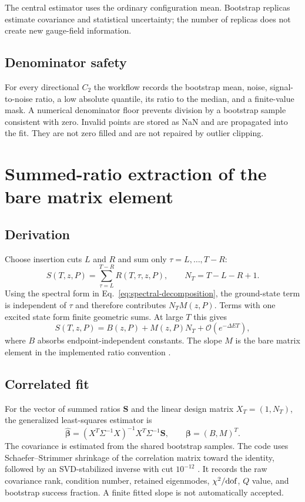 \documentclass[11pt]{article}
\numberwithin{equation}{section}
\newcommand{\cO}{\mathcal{O}}
\begin{document}
The central estimator uses the ordinary configuration mean.  Bootstrap
replicas estimate covariance and statistical uncertainty; the number of
replicas does not create new gauge-field information.

\subsection{Denominator safety}

For every directional $C_2$ the workflow records the bootstrap mean, noise,
signal-to-noise ratio, a low absolute quantile, its ratio to the median, and a
finite-value mask.  A numerical denominator floor prevents division by a
bootstrap sample consistent with zero.  Invalid points are stored as NaN and
are propagated into the fit.  They are not zero filled and are not repaired by
outlier clipping.

\section{Summed-ratio extraction of the bare matrix element}

\subsection{Derivation}

Choose insertion cuts $L$ and $R$ and sum only
$\tau=L,\ldots,T-R$:
\begin{equation}
  S(T,z,P)=\sum_{\tau=L}^{T-R}R(T,\tau,z,P),
  \qquad N_T=T-L-R+1.
  \label{eq:summed-ratio}
\end{equation}
Using the spectral form in Eq.~\eqref{eq:spectral-decomposition}, the
ground-state term is independent of $\tau$ and therefore contributes
$N_T M(z,P)$.  Terms with one excited state form finite geometric sums.  At
large $T$ this gives
\begin{equation}
  S(T,z,P)=B(z,P)+M(z,P)N_T
  +\cO(e^{-\Delta E T}),
  \label{eq:summation-fit}
\end{equation}
where $B$ absorbs endpoint-independent constants.  The slope $M$ is the bare
matrix element in the implemented ratio convention \cite{Bulava2012}.

\subsection{Correlated fit}

For the vector of summed ratios $\bm S$ and the linear design matrix
$X_T=(1,N_T)$, the generalized least-squares estimator is
\begin{equation}
  \widehat{\bm\beta}
  =(X^T\Sigma^{-1}X)^{-1}X^T\Sigma^{-1}\bm S,
  \qquad \bm\beta=(B,M)^T.
  \label{eq:gls}
\end{equation}
The covariance is estimated from the shared bootstrap samples.  The code uses
Schaefer--Strimmer shrinkage of the correlation matrix toward the identity,
followed by an SVD-stabilized inverse with cut $10^{-12}$
\cite{SchaeferStrimmer2005}.  It records the raw covariance rank, condition
number, retained eigenmodes, $\chi^2/{\rm dof}$, $Q$ value, and bootstrap
success fraction.  A finite fitted slope is not automatically accepted.
\end{document}
